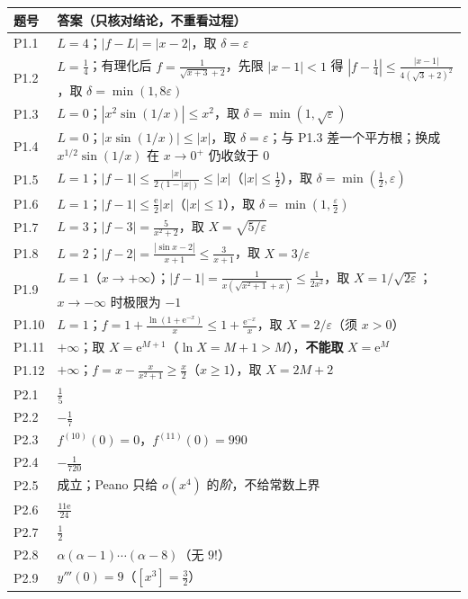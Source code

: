 \documentclass[11pt,a4paper]{ctexart}
\newcommand{\eps}{\varepsilon}
\newcommand{\abs}[1]{\left\lvert #1\right\rvert}
\newcommand{\ee}{\mathrm{e}}
\begin{document}
{\small\setlength{\tabcolsep}{4pt}
\begin{longtable}{@{}p{1.25cm}p{12.3cm}@{}}
\toprule
题号 & 答案（只核对结论，不重看过程）\\
\midrule
\endhead
P1.1 & $L=4$；$\abs{f-L}=\abs{x-2}$，取 $\delta=\eps$\\
P1.2 & $L=\frac{1}{4}$；有理化后 $f=\frac{1}{\sqrt{x+3}+2}$，先限 $\abs{x-1}<1$ 得 $\abs{f-\frac{1}{4}}\le \frac{\abs{x-1}}{4(\sqrt{3}+2)^{2}}$，取 $\delta=\min(1,8\eps)$\\
P1.3 & $L=0$；$\abs{x^{2}\sin(1/x)}\le x^{2}$，取 $\delta=\min(1,\sqrt{\eps})$\\
P1.4 & $L=0$；$\abs{x\sin(1/x)}\le \abs{x}$，取 $\delta=\eps$；与 P1.3 差一个平方根；换成 $x^{1/2}\sin(1/x)$ 在 $x\to0^{+}$ 仍收敛于 0\\
P1.5 & $L=1$；$\abs{f-1}\le \frac{\abs{x}}{2(1-\abs{x})}\le \abs{x}$（$\abs{x}\le\frac{1}{2}$），取 $\delta=\min(\frac{1}{2},\eps)$\\
P1.6 & $L=1$；$\abs{f-1}\le \frac{\ee}{2}\abs{x}$（$\abs{x}\le 1$），取 $\delta=\min(1,\frac{\eps}{2})$\\
P1.7 & $L=3$；$\abs{f-3}=\frac{5}{x^{2}+2}$，取 $X=\sqrt{5/\eps}$\\
P1.8 & $L=2$；$\abs{f-2}=\frac{\abs{\sin x-2}}{x+1}\le \frac{3}{x+1}$，取 $X=3/\eps$\\
P1.9 & $L=1$（$x\to+\infty$）；$\abs{f-1}=\frac{1}{x(\sqrt{x^{2}+1}+x)}\le\frac{1}{2x^{2}}$，取 $X=1/\sqrt{2\eps}$；$x\to-\infty$ 时极限为 $-1$\\
P1.10 & $L=1$；$f=1+\frac{\ln(1+\ee^{-x})}{x}\le 1+\frac{\ee^{-x}}{x}$，取 $X=2/\eps$（须 $x>0$）\\
P1.11 & $+\infty$；取 $X=\ee^{M+1}$（$\ln X=M+1>M$），\textbf{不能取} $X=\ee^{M}$\\
P1.12 & $+\infty$；$f=x-\frac{x}{x^{2}+1}\ge \frac{x}{2}$（$x\ge1$），取 $X=2M+2$\\
\midrule
P2.1 & $\frac{1}{5}$\\
P2.2 & $-\frac{1}{7}$\\
P2.3 & $f^{(10)}(0)=0$，$f^{(11)}(0)=990$\\
P2.4 & $-\frac{1}{720}$\\
P2.5 & 成立；Peano 只给 $o(x^{4})$ 的\emph{阶}，不给常数上界\\
P2.6 & $\frac{11\ee}{24}$\\
P2.7 & $\frac{1}{2}$\\
P2.8 & $\alpha(\alpha-1)\cdots(\alpha-8)$（无 $9!$）\\
P2.9 & $y'''(0)=9$（$[x^{3}]=\frac{3}{2}$）\\

\end{longtable}}
\end{document}
